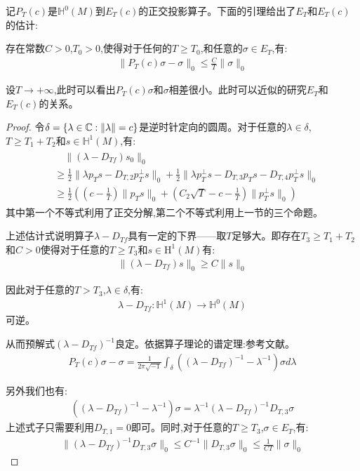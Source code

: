 记$P_T(c)$是$\mathbb{H}^0(M)$到$E_T(c)$的正交投影算子。下面的引理给出了$E_T$和$E_T(c)$的估计:
\begin{lemma}\label{lem:vertical}
	存在常数$C>0$,$T_0>0$,使得对于任何的$T\geq T_0$,和任意的$\sigma \in E_T$,有:
	\begin{align}
		\|P_T(c)\sigma-\sigma\|_0 \leq \frac{C}{T}\|\sigma\|_0
	\end{align}
\end{lemma}
设$T \to +\infty$,此时可以看出$P_T(c)\sigma$和$\sigma$相差很小。此时可以近似的研究$E_T$和$E_T(c)
$的关系。
\begin{proof}
	令$\delta=\{\lambda \in \mathbb{C}:\|\lambda\|=c\}$是逆时针定向的圆周。对于任意的$\lambda \in \delta$,$T\geq T_1+T_2$和$s \in \mathbb{H}^1(M)$,有:
	\begin{align}
		\begin{split}
			&{\quad}\|(\lambda-D_{Tf})s_0\|_0 \\
			&\geq \frac{1}{2}\|\lambda p_T s-D_{T,2}p_T^{\perp}s\|_0+\frac{1}{2}\|\lambda p_T^{\perp}s-D_{T,3}p_Ts-D_{T,4}p_T^{\perp}s\|_0\\
			&\geq \frac{1}{2}((c-\frac{1}{T})\|p_T s\|_0+(C_2\sqrt{T}-c-\frac{1}{T})\|p_T^{\perp}s\|_0)
		\end{split}
	\end{align}
	其中第一个不等式利用了正交分解,第二个不等式利用上一节的三个命题。

	上述估计式说明算子$\lambda-D_{Tf}$具有一定的下界——取$T$足够大。即存在$T_3 \geq T_1+T_2$和$C>0$使得对于任意的$T\geq T_3$和$s \in \mathrm{H}^1(M)$有:
	\begin{align}
		\|(\lambda-D_{Tf})s\|_0\geq C\|s\|_0
	\end{align}

	因此对于任意的$T>T_3$,$\lambda \in \delta$,有:
	\begin{align}
		\lambda-D_{Tf}:\mathbb{H}^1(M)\to \mathbb{H}^0(M)
	\end{align}
	可逆。

	从而预解式$(\lambda-D_{Tf})^{-1}$良定。依据算子理论的谱定理:参考文献。
	\begin{align}
		P_T(c)\sigma-\sigma=\frac{1}{2\pi \sqrt{-1}}\int_{\delta}((\lambda-D_{Tf})^{-1}-\lambda^{-1})\sigma d\lambda
	\end{align}

	另外我们也有:
	\begin{align}
		((\lambda-D_{Tf})^{-1}-\lambda^{-1})\sigma=\lambda^{-1}(\lambda-D_{Tf})^{-1}D_{T,3}\sigma
	\end{align}
	上述式子只需要利用$D_{T,1}=0$即可。同时,对于任意的$T\geq T_3$,$\sigma \in E_T$,有:
	\begin{align}
		\|(\lambda-D_{Tf})^{-1}D_{T,3}\sigma\|_0 \leq C^{-1}\|D_{T,3}\sigma\|_0\leq \frac{1}{CT}\|\sigma\|_0
	\end{align}
\end{proof}
